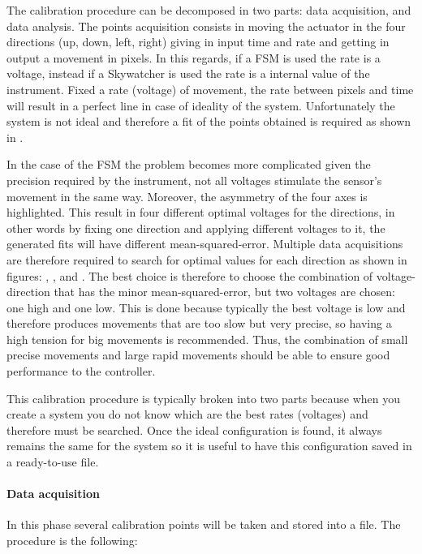 The calibration procedure can be decomposed in two parts:
data acquisition, and data analysis. The points acquisition consists in moving the actuator in the four directions (up, down, left, right) giving in input time and rate and getting in output a movement in pixels.
In this regards, if a FSM is used the rate is a voltage, instead if a Skywatcher is used the rate is a internal value of the instrument.
Fixed a rate (voltage) of movement, the rate between pixels and time will result in a perfect line in case of ideality of the system. Unfortunately the system is not ideal and therefore a fit of the points obtained is required as shown in .

In the case of the FSM the problem becomes more complicated given the precision required by the instrument, not all voltages stimulate the sensor’s movement in the same way. Moreover, the asymmetry of the four axes is highlighted.
This result in four different optimal voltages for the directions, in other words by fixing one direction and applying different voltages to it, the generated fits will have different mean-squared-error. Multiple data acquisitions are therefore required to search for optimal values for each direction as shown in figures: , , and .
The best choice is therefore to choose the combination of voltage-direction that has the minor mean-squared-error, but two voltages are chosen: one high and one low. This is done because typically the best voltage is low and therefore produces movements that are too slow but very precise, so having a high tension for big movements is recommended. Thus, the combination of small precise movements and large rapid movements should be able to ensure good performance to the controller.


This calibration procedure is typically broken into two parts because when you create a system you do not know which are the best rates (voltages) and therefore must be searched.
Once the ideal configuration is found, it always remains the same for the system so it is useful to have this configuration saved in a ready-to-use file.

\paragraph{Data acquisition}

In this phase several calibration points will be taken and stored into a file. The procedure
is the following:


